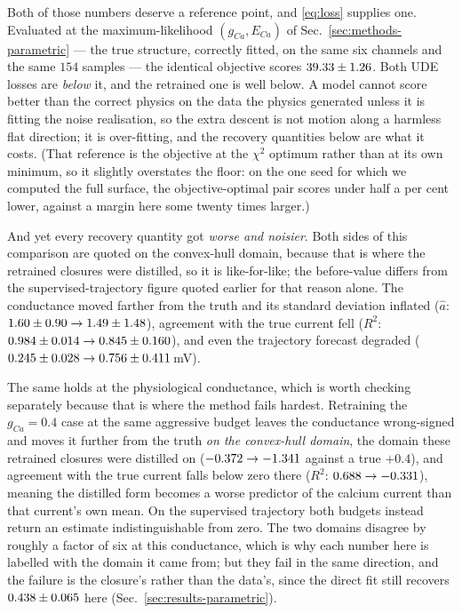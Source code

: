 \documentclass{article}
\newcommand{\Ttrain}{30}       %
\newcommand{\Ntrain}{154}      %
\newcommand{\gcaPhys}{0.4}     %
\begin{document}
Both of those numbers deserve a reference point, and \eqref{eq:loss} supplies
one. Evaluated at the maximum-likelihood $(g_{Ca}, E_{Ca})$ of
Sec.~\ref{sec:methods-parametric} --- the true structure, correctly fitted, on
the same six channels and the same $\Ntrain$ samples --- the identical objective
scores $39.33 \pm 1.26$. Both UDE losses are \emph{below} it, and
the retrained one is well below. A model cannot score better than the correct
physics on the data the physics generated unless it is fitting the noise
realisation, so the extra descent is not motion along a harmless flat direction;
it is over-fitting, and the recovery quantities below are what it costs. (That
reference is the objective at the $\chi^2$ optimum rather than at its own
minimum, so it slightly overstates the floor: on the one seed for which we
computed the full surface, the objective-optimal pair scores under half a per
cent lower, against a margin here some twenty times larger.)

And yet every recovery quantity got \emph{worse and noisier}. Both sides of this
comparison are quoted on the convex-hull domain, because that is where the
retrained closures were distilled, so it is like-for-like; the before-value
differs from the supervised-trajectory figure quoted earlier for that reason
alone. The conductance moved farther from the truth and its standard deviation
inflated
($\hat a$: $1.60 \pm 0.90 \to 1.49 \pm 1.48$), agreement with
the true current fell
($R^2$: $0.984 \pm 0.014 \to 0.845 \pm 0.160$), and
even the trajectory forecast degraded
($0.245 \pm 0.028 \to 0.756 \pm 0.411$\,mV).

The same holds at the physiological conductance, which is worth checking
separately because that is where the method fails hardest. Retraining the
$g_{Ca}=\gcaPhys$ case at the same aggressive budget leaves the conductance
wrong-signed and moves it further from the truth \emph{on the convex-hull
domain}, the domain these retrained closures were distilled on
($-0.372 \to -1.341$ against a true
$+\gcaPhys$), and agreement with the true current falls below zero there
($R^2$: $0.688 \to -0.331$), meaning
the distilled form becomes a worse predictor of the calcium current than that
current's own mean. On the supervised trajectory both budgets instead return an
estimate indistinguishable from zero. The two domains disagree by roughly a
factor of six at this conductance, which is why each number here is labelled with
the domain it came from; but they fail in the same direction, and the failure is
the closure's rather than the data's, since the direct fit still recovers
$0.438 \pm 0.065$ here
(Sec.~\ref{sec:results-parametric}).
\end{document}
